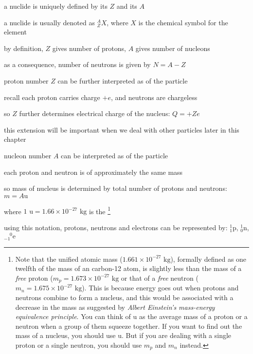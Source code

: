 a nuclide is uniquely defined by its  $Z$ and its  $A$

a nuclide is usually denoted as $\boxed{_Z^A X}$, where $X$ is the chemical symbol for the element

\cmt by definition, $Z$ gives number of protons, $A$ gives number of nucleons

as a consequence, number of neutrons is given by $N = A-Z$

\cmt proton number $Z$ can be further interpreted as  of the particle 

recall each proton carries charge $+e$, and neutrons are chargeless

so $Z$ further determines electrical charge of the nucleus: $\boxed{Q = +Ze}$

this extension will be important when we deal with other particles later in this chapter

\cmt nucleon number $A$ can be interpreted as  of the particle 

each proton and neutron is of approximately the same mass

so mass of nucleus is determined by total number of protons and neutrons: $\boxed{m = A\text{u}}$

where $1 \text{ u} = 1.66\times10^{-27} \text{ kg}$ is the 
\footnote{Note that the unified atomic mass ($1.661\times10^{-27} \text{ kg}$), formally defined as one twelfth of the mass of an carbon-12 atom, is slightly less than the mass of a \emph{free} proton ($m_p=1.673\times10^{-27} \text{ kg}$ or that of a \emph{free} neutron ($m_n=1.675\times10^{-27} \text{ kg}$). This is because energy goes out when protons and neutrons combine to form a nucleus, and this would be associated with a decrease in the mass as suggested by \emph{Albert Einstein's mass-energy equivalence principle}. You can think of $\text{u}$ as the average mass of a proton or a neutron when a group of them squeeze together. If you want to find out the mass of a nucleus, you should use $\text{u}$. But if you are dealing with a single proton or a single neutron, you should use $m_p$ and $m_n$ instead.}

\cmt using this notation, protons, neutrons and electrons can be represented by: $ \boxed{^1_1\text{p}}$, $\boxed{^1_0\text{n}}$, $\boxed{^{\phantom{-}0}_{-1}\text{e}} $


